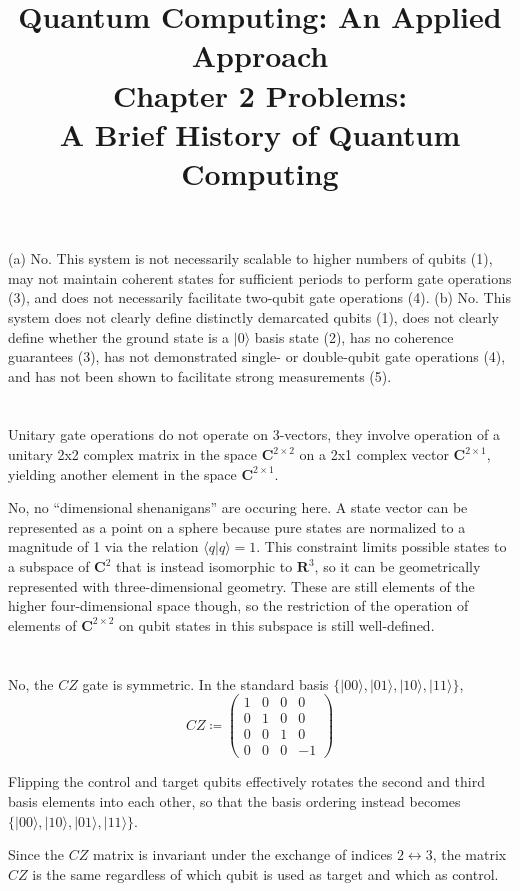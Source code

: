\documentclass{article}
\date{}
\title{\textbf{Quantum Computing: An Applied Approach}\\\vspace*{1cm}
Chapter 2 Problems: \\
A Brief History of Quantum Computing
}
\begin{document}
\maketitle

\section{}

(a) No. This system is not necessarily scalable to higher numbers of qubits (1), may not maintain coherent states for sufficient periods to perform gate operations (3), and does not necessarily facilitate two-qubit gate operations (4).\newline
(b) No. This system does not clearly define distinctly demarcated qubits (1), does not clearly define whether the ground state is a $|0\rangle$ basis state (2), has no coherence guarantees (3), has not demonstrated single- or double-qubit gate operations (4), and has not been shown to facilitate strong measurements (5).

\section{}

Unitary gate operations do not operate on 3-vectors, they involve operation of a unitary 2x2 complex matrix in the space $\mathbf{C}^{2\times 2}$ on a 2x1 complex vector $\mathbf{C}^{2\times 1}$, yielding another element in the space $\mathbf{C}^{2\times 1}$.

No, no ``dimensional shenanigans'' are occuring here. A state vector can be represented as a point on a sphere because pure states are normalized to a magnitude of 1 via the relation $\langle q|q\rangle=1$. This constraint limits possible states to a subspace of $\mathbf{C}^2$ that is instead isomorphic to $\mathbf{R}^3$, so it can be geometrically represented with three-dimensional geometry. These are still elements of the higher four-dimensional space though, so the restriction of the operation of elements of $\mathbf{C}^{2\times 2}$ on qubit states in this subspace is still well-defined.

\section{}

No, the $CZ$ gate is symmetric. In the standard basis $\{|00\rangle,|01\rangle,|10\rangle,|11\rangle\}$,
$$
CZ\coloneqq \begin{pmatrix}
1 & 0 & 0 & 0\\
0 & 1 & 0 & 0\\
0 & 0 & 1 & 0\\
0 & 0 & 0 & -1
\end{pmatrix}
$$

Flipping the control and target qubits effectively rotates the second and third basis elements into each other, so that the basis ordering instead becomes $\{|00\rangle,|10\rangle,|01\rangle,|11\rangle\}$.

Since the $CZ$ matrix is invariant under the exchange of indices $2\leftrightarrow 3$, the matrix $CZ$ is the same regardless of which qubit is used as target and which as control.
\end{document}
